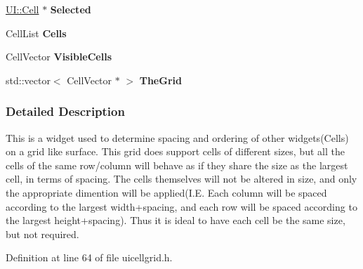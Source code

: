 \begin{DoxyCompactItemize}
\item 
\hypertarget{classphys_1_1UI_1_1CellGrid_ae5864a7174fee981647f339075a11e10}{
\hyperlink{classphys_1_1UI_1_1Cell}{UI::Cell} $\ast$ {\bfseries Selected}}
\label{d8/d59/classphys_1_1UI_1_1CellGrid_ae5864a7174fee981647f339075a11e10}

\item 
\hypertarget{classphys_1_1UI_1_1CellGrid_ac4bb16b8e9fa149d2196362e32a57fdf}{
CellList {\bfseries Cells}}
\label{d8/d59/classphys_1_1UI_1_1CellGrid_ac4bb16b8e9fa149d2196362e32a57fdf}

\item 
\hypertarget{classphys_1_1UI_1_1CellGrid_a7fcb9ac98852926abf686df661acc72d}{
CellVector {\bfseries VisibleCells}}
\label{d8/d59/classphys_1_1UI_1_1CellGrid_a7fcb9ac98852926abf686df661acc72d}

\item 
\hypertarget{classphys_1_1UI_1_1CellGrid_a38f49946396c1d3f1f34edb3e9bf4297}{
std::vector$<$ CellVector $\ast$ $>$ {\bfseries TheGrid}}
\label{d8/d59/classphys_1_1UI_1_1CellGrid_a38f49946396c1d3f1f34edb3e9bf4297}

\end{DoxyCompactItemize}


\subsubsection{Detailed Description}
This is a widget used to determine spacing and ordering of other widgets(Cells) on a grid like surface. This grid does support cells of different sizes, but all the cells of the same row/column will behave as if they share the size as the largest cell, in terms of spacing. The cells themselves will not be altered in size, and only the appropriate dimention will be applied(I.E. Each column will be spaced according to the largest width+spacing, and each row will be spaced according to the largest height+spacing). Thus it is ideal to have each cell be the same size, but not required. 

Definition at line 64 of file uicellgrid.h.



